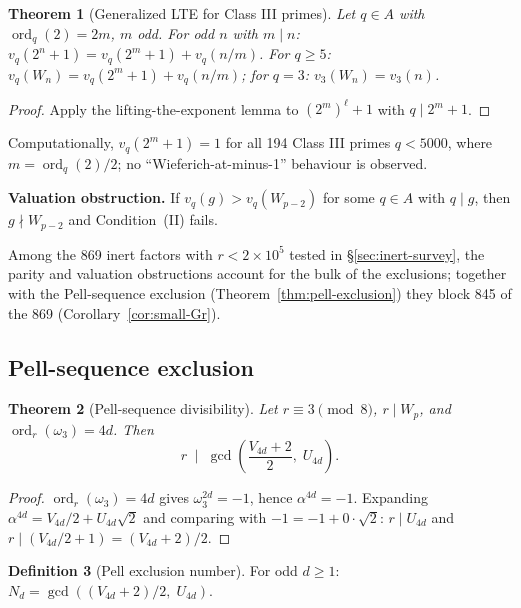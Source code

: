 \documentclass[11pt]{amsart}
\theoremstyle{plain}
\newtheorem{theorem}{Theorem}[section]
\theoremstyle{definition}
\newtheorem{definition}[theorem]{Definition}
\theoremstyle{remark}
\numberwithin{equation}{section}
\newcommand{\ord}{\operatorname{ord}}
\begin{document}
\begin{theorem}[Generalized LTE for Class III primes]\label{thm:lte}
Let $q \in A$ with $\ord_q(2) = 2 m$, $m$ odd. For odd $n$ with $m \mid n$: $v_q(2^n + 1) = v_q(2^m + 1) + v_q(n / m)$. For $q \geq 5$: $v_q(W_n) = v_q(2^m + 1) + v_q(n/m)$; for $q = 3$: $v_3(W_n) = v_3(n)$.
\end{theorem}

\begin{proof}
Apply the lifting-the-exponent lemma to $(2^m)^\ell + 1$ with $q \mid 2^m + 1$.
\end{proof}

Computationally, $v_q(2^m + 1) = 1$ for all 194 Class III primes $q < 5000$, where $m = \ord_q(2)/2$; no ``Wieferich-at-minus-1'' behaviour is observed.

\textbf{Valuation obstruction.} If $v_q(g) > v_q(W_{p-2})$ for some $q \in A$ with $q \mid g$, then $g \nmid W_{p-2}$ and Condition~(II) fails.

Among the 869 inert factors with $r < 2 \times 10^5$ tested in \S\ref{sec:inert-survey}, the parity and valuation obstructions account for the bulk of the exclusions; together with the Pell-sequence exclusion (Theorem~\ref{thm:pell-exclusion}) they block 845 of the 869 (Corollary~\ref{cor:small-Gr}).

\subsection{Pell-sequence exclusion}

\begin{theorem}[Pell-sequence divisibility]\label{thm:pell-divisibility}
Let $r \equiv 3 \pmod 8$, $r \mid W_p$, and $\ord_r(\omega_3) = 4 d$. Then
\[
  r \;\;\Big|\;\; \gcd\!\left(\frac{V_{4d} + 2}{2},\; U_{4d}\right).
\]
\end{theorem}

\begin{proof}
$\ord_r(\omega_3) = 4 d$ gives $\omega_3^{2d} = -1$, hence $\alpha^{4d} = -1$. Expanding $\alpha^{4d} = V_{4d}/2 + U_{4d} \sqrt 2$ and comparing with $-1 = -1 + 0 \cdot \sqrt 2$: $r \mid U_{4d}$ and $r \mid (V_{4d}/2 + 1) = (V_{4d} + 2)/2$.
\end{proof}

\begin{definition}[Pell exclusion number]\label{def:pell-exclusion-number}
For odd $d \geq 1$: $N_d = \gcd((V_{4d} + 2)/2,\; U_{4d})$.
\end{definition}
\end{document}
